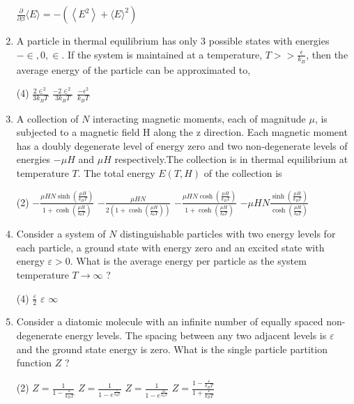 \begin{enumerate}
\begin{tasks}
		\task[\textbf{D.}] $\frac{\partial}{\partial \beta}\langle E\rangle=-\left(\left\langle E^{2}\right\rangle+\langle E\rangle^{2}\right)$
	\end{tasks}
	\item A particle in thermal equilibrium has only 3 possible states with energies $-\in, 0, \in .$ If the system is maintained at a temperature, $T>>\frac{\epsilon}{k_{B}}$, then the average energy of the particle can be approximated to,
	{}
	\begin{tasks}(4)
		\task[\textbf{A.}] $\frac{2 \in^{2}}{3 k_{B} T}$
		\task[\textbf{B.}] $\frac{-2 \in^{2}}{3 k_{B} T}$
		\task[\textbf{C.}] $\frac{-\epsilon^{2}}{k_{B} T}$
	\end{tasks}
	\item A collection of $N$ interacting magnetic moments, each of magnitude $\mu$, is subjected to a magnetic field $\mathrm{H}$ along the $\mathrm{z}$ direction. Each magnetic moment has a doubly degenerate level of energy zero and two non-degenerate levels of energies $-\mu H$ and $\mu H$ respectively.The collection is in thermal equilibrium at temperature $T$. The total energy $E(T, H)$ of the collection is
	{}
	\begin{tasks}(2)
		\task[\textbf{A.}] $-\frac{\mu H N \sinh \left(\frac{\mu H}{k_{B} T}\right)}{1+\cosh \left(\frac{\mu H}{k_{b} T}\right)}$
		\task[\textbf{B.}] $-\frac{\mu H N}{2\left(1+\cosh \left(\frac{\mu H}{k_{b} T}\right)\right)}$
		\task[\textbf{C.}] $-\frac{\mu H N \cosh \left(\frac{\mu H}{k_{B} T}\right)}{1+\cosh \left(\frac{\mu H}{k_{b} T}\right)}$
		\task[\textbf{D.}] $-\mu H N \frac{\sinh \left(\frac{\mu H}{k_{B} T}\right)}{\cosh \left(\frac{\mu H}{k_{b} T}\right)}$
	\end{tasks}
	\item 	Consider a system of $N$ distinguishable particles with two energy levels for each particle, a ground state with energy zero and an excited state with energy $\varepsilon>0$. What is the average energy per particle as the system temperature $T \rightarrow \infty$ ?
	{}
	\begin{tasks}(4)
		\task[\textbf{B.}]  $\frac{\varepsilon}{2}$
		\task[\textbf{C.}] $\varepsilon$
		\task[\textbf{D.}] $\infty$
	\end{tasks}
	\item Consider a diatomic molecule with an infinite number of equally spaced non-degenerate energy levels. The spacing between any two adjacent levels is $\varepsilon$ and the ground state energy is zero. What is the single particle partition function $Z$ ?
	{}
	\begin{tasks}(2)
		\task[\textbf{A.}] $Z=\frac{1}{1-\frac{\varepsilon}{k_{B} T}}$
		\task[\textbf{B.}] $Z=\frac{1}{1-e^{\frac{\varepsilon}{k_{\mathrm{B}} T}}}$
		\task[\textbf{C.}] $Z=\frac{1}{1-e^{\frac{2 \varepsilon}{k_{B} T}}}$
		\task[\textbf{D.}] $Z=\frac{1-\frac{\varepsilon}{k_{B} T}}{1+\frac{\varepsilon}{k_{B} T}}$
	\end{tasks}
\end{enumerate}
